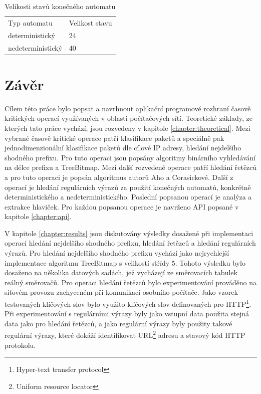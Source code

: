 \begin{table}[!htbp]
    \center
    \begin{tabular}{|l|l|}
    \hline
    Typ automatu & Velikost stavu\\ \hhline{|=|=|}
    deterministický  & 24\\ \hline
    nedeterministický & 40\\ \hline
    \end{tabular}
    \caption{Velikosti stavů konečného automatu}
    \label{tab:regex-size}
\end{table}

\chapter{Závěr}\label{chapter:conclusion} %
Cílem této práce bylo popsat a navrhnout aplikační programové rozhraní časově kritických operací využívaných v oblasti
počítačových sítí.
Teoretické základy, ze kterých tato práce vychází, jsou rozvedeny v kapitole \ref{chapter:theoretical}.
Mezi vybrané časově kritické operace patří klasifikace paketů a speciálně pak jednodimenzionální klasifikace paketů
dle cílové IP adresy, hledání nejdelšího shodného prefixu. Pro tuto operaci jsou popsány
algoritmy binárního vyhledávání na délce prefixu a TreeBitmap.
Mezi další rozvedené operace patří hledání řetězců a pro tuto operaci je popsán
algoritmus autorů Aho a Corasickové. Další z operací je hledání regulárních výrazů
za použití konečných automatů, konkrétně deterministického a nedeterministického.
Poslední popsanou operací je analýza a extrakce hlaviček.
Pro každou popsanou operace je navrženo API popsané v kapitole \ref{chapter:api}.

V kapitole \ref{chapter:results} jsou diskutovány výsledky dosažené
při implementaci operací hledání nejdelšího shodného prefixu, hledání řetězců a hledání regulárních
výrazů. Pro hledání nejdelšího shodného prefixu vychází jako nejrychlejší implementace algoritmu
TreeBitmap s velikostí střídy 5. Tohoto výsledku bylo dosaženo na několika datových sadách,
jež vycházejí ze směrovacích tabulek reálný směrovačů.
Pro operaci hledání řetězců bylo experimentování prováděno na síťovém provozu zachyceném
při komunikaci osobního počítače. Jako vzorek
testovaných klíčových slov bylo využito klíčových slov definovaných pro HTTP\footnote{Hyper-text transfer protocol}.
Při experimentování s regulárními výrazy byly jako vstupní data použita stejná data jako pro hledání řetězců,
a jako regulární výrazy byly použity takové regulární výrazy, které dokáží identifikovat URL\footnote{Uniform resource locator} adresu a stavový kód HTTP protokolu.

